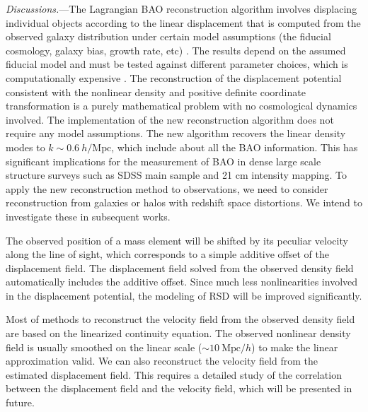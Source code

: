 \documentclass[aps,prl,twocolumn,showpacs,superscriptaddress,groupedaddress,nofootinbib]{revtex4}  %
\newcommand{\mr}{\mathrm}
\begin{document}
{\it Discussions.}---The Lagrangian BAO reconstruction algorithm involves displacing 
individual objects according to the linear displacement that is computed from the observed
galaxy distribution under certain model assumptions (the fiducial cosmology, galaxy bias, 
growth rate, etc) \cite{2007bao,2015marcel}.
The results depend on the assumed fiducial model and must be tested against different 
parameter choices, which is computationally expensive \cite{2012nikhil}.
The reconstruction of the displacement potential consistent with the nonlinear density
and positive definite coordinate transformation is a purely mathematical problem with no
cosmological dynamics involved. 
The implementation of the new reconstruction algorithm does not require any model assumptions.
The new algorithm recovers the linear density modes to $k\sim0.6\ h/\mr{Mpc}$, 
which include about all the BAO information. 
This has significant implications for the measurement of BAO in dense large scale structure
surveys such as SDSS main sample and 21 cm intensity mapping.
To apply the new reconstruction method to observations, we need to consider 
reconstruction from galaxies or halos with redshift space distortions.
We intend to investigate these in subsequent works. 

The observed position of a mass element will be shifted by its peculiar
velocity along the line of sight, which corresponds to a simple additive offset of
the displacement field. The displacement field solved from the observed density field
automatically includes the additive offset. 
Since much less nonlinearities involved in the displacement potential, the modeling of RSD
will be improved significantly.

Most of methods to reconstruct the velocity field from the observed density 
field are based on the linearized continuity equation.
The observed nonlinear density field is usually smoothed on the linear scale
($\sim10\ \mr{Mpc}/h$) to make the linear approximation valid.
We can also reconstruct the velocity field from the estimated displacement 
field.
This requires a detailed study of the correlation between the displacement 
field and the velocity field, which will be presented in future.

\end{document}
